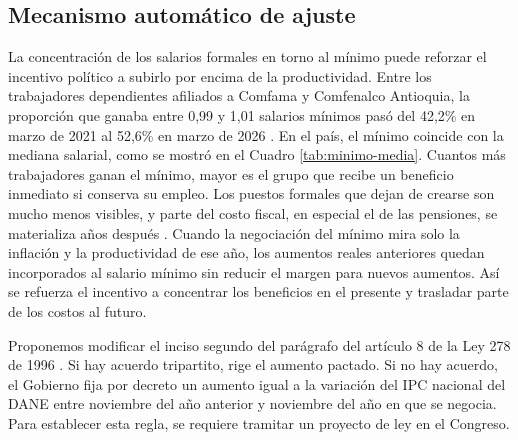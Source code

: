 
\subsection{Mecanismo automático de ajuste}

La concentración de los salarios formales en torno al mínimo puede reforzar el incentivo político a subirlo por encima de la productividad. Entre los trabajadores dependientes afiliados a Comfama y Comfenalco Antioquia, la proporción que ganaba entre 0,99 y 1,01 salarios mínimos pasó del 42,2\% en marzo de 2021 al 52,6\% en marzo de 2026 \citep{chaparro}. En el país, el mínimo coincide con la mediana salarial, como se mostró en el Cuadro \ref{tab:minimo-media}. Cuantos más trabajadores ganan el mínimo, mayor es el grupo que recibe un beneficio inmediato si conserva su empleo. Los puestos formales que dejan de crearse son mucho menos visibles, y parte del costo fiscal, en especial el de las pensiones, se materializa años después \citep{florez2022,carf22}. Cuando la negociación del mínimo mira solo la inflación y la productividad de ese año, los aumentos reales anteriores quedan incorporados al salario mínimo sin reducir el margen para nuevos aumentos. Así se refuerza el incentivo a concentrar los beneficios en el presente y trasladar parte de los costos al futuro.

Proponemos modificar el inciso segundo del parágrafo del artículo 8 de la Ley 278 de 1996 \citep{ley278}. Si hay acuerdo tripartito, rige el aumento pactado. Si no hay acuerdo, el Gobierno fija por decreto un aumento igual a la variación del IPC nacional del DANE entre noviembre del año anterior y noviembre del año en que se negocia. Para establecer esta regla, se requiere tramitar un proyecto de ley en el Congreso.



%

